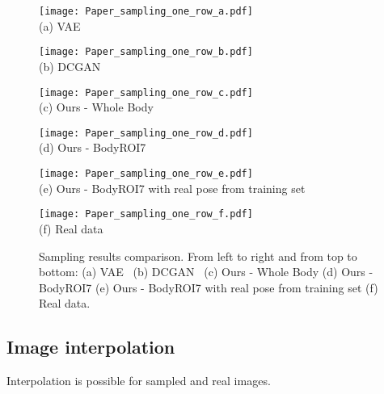 \documentclass[10pt,twocolumn,letterpaper]{article}
\begin{document}
\begin{figure*} [htp]
\scriptsize
\begin{minipage}{0.33\textwidth}
\centering
  \centering
  \texttt{[image: Paper\_sampling\_one\_row\_a.pdf]}\\
(a) VAE~\cite{VAE}
\vspace{1mm}
\end{minipage}
\hfill
\begin{minipage}{0.33\textwidth}
\centering
  \centering
  \texttt{[image: Paper\_sampling\_one\_row\_b.pdf]}\\
(b) DCGAN~\cite{DCGAN}
\vspace{1mm}
\end{minipage}
\hfill
\begin{minipage}{0.33\textwidth}
\centering
  \centering
  \texttt{[image: Paper\_sampling\_one\_row\_c.pdf]}\\
(c) Ours - Whole Body
\vspace{1mm}
\end{minipage}
\hfill
\begin{minipage}{0.33\textwidth}
\centering
  \centering
  \texttt{[image: Paper\_sampling\_one\_row\_d.pdf]}\\
(d) Ours - BodyROI7
\vspace{-0.5mm}
\end{minipage}
\hfill
\begin{minipage}{0.33\textwidth}
\centering
  \centering
  \texttt{[image: Paper\_sampling\_one\_row\_e.pdf]}\\
(e) Ours - BodyROI7 with real pose from training set
\vspace{-0.5mm}
\end{minipage}
\hfill
\begin{minipage}{0.33\textwidth}
\centering
  \centering
  \texttt{[image: Paper\_sampling\_one\_row\_f.pdf]}\\
(f) Real data
\vspace{-0.5mm}
\end{minipage}
\vspace{-0.5mm}
\caption{Sampling results comparison. From left to right and from top to bottom: (a) VAE~\cite{VAE} (b) DCGAN~\cite{DCGAN} (c) Ours - Whole Body (d) Ours - BodyROI7 (e) Ours - BodyROI7 with real pose from training set (f) Real data.}
\label{fig:Paper_sampling}
\end{figure*}

\subsection{Image interpolation}
\vspace{-0.5mm}
\label{sec:exp_interpolate}
Interpolation is possible for sampled and real images. 
\end{document}
